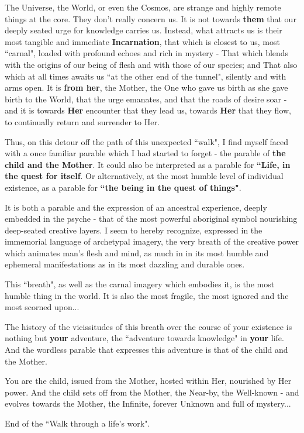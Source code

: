 The Universe, the World, or even the Cosmos, are strange and highly remote things at the core. They don't really concern us. It is not towards \textbf{them} that our deeply seated urge for knowledge carries us. Instead, what attracts us is their most tangible and immediate \textbf{Incarnation}, that which is closest to us, most ``carnal", loaded with profound echoes and rich in mystery - That which blends with the origins of our being of flesh and with those of our species; and That also which at all times awaits us ``at the other end of the tunnel", silently and with arms open. It is \textbf{from her}, the Mother, the One who gave us birth as she gave birth to the World, that the urge emanates, and that the roads of desire soar - and it is towards \textbf{Her} encounter that they lead us, towards \textbf{Her} that they flow, to continually return and surrender to Her.

Thus, on this detour off the path of this unexpected ``walk", I find myself faced with a once familiar parable which I had started to forget - the parable of \textbf{the child and the Mother}. It could also be interpreted as a parable for \textbf{``Life, in the quest for itself}. Or alternatively, at the most humble level of individual existence, as a parable for \textbf{``the being in the quest of things"}. 

It is both a parable and the expression of an ancestral experience, deeply embedded in the psyche - that of the most powerful aboriginal symbol nourishing deep-seated creative layers. I seem to hereby recognize, expressed in the immemorial language of archetypal imagery, the very breath of the creative power which animates man's flesh and mind, as much in in its most humble and ephemeral manifestations as in its most dazzling and durable ones. 

This ``breath", as well as the carnal imagery which embodies it, is the most humble thing in the world. It is also the most fragile, the most ignored and the most scorned upon...

The history of the vicissitudes of this breath over the course of your existence is nothing but \textbf{your} adventure, the ``adventure towards knowledge" in \textbf{your} life. And the wordless parable that expresses this adventure is that of the child and the Mother.

You are the child, issued from the Mother, hosted within Her, nourished by Her power. And the child sets off from the Mother, the Near-by, the Well-known - and evolves towards the Mother, the Infinite, forever Unknown and full of mystery...

\begin{flushright}
End of the ``Walk through a life's work". 
\end{flushright}

% 
